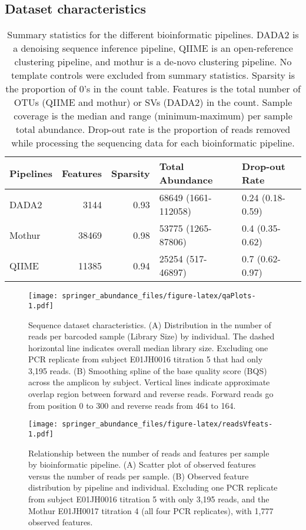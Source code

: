 \documentclass[smallextended]{svjour3}       %
\begin{document}
\hypertarget{dataset-characteristics}{%
\subsection{Dataset characteristics}\label{dataset-characteristics}}

\begin{table}

\caption{\label{tab:pipeQA}Summary statistics for the different bioinformatic pipelines. DADA2 is a denoising sequence inference pipeline, QIIME is an open-reference clustering pipeline, and mothur is a de-novo clustering pipeline. No template controls were excluded from summary statistics. Sparsity is the proportion of 0's in the count table. Features is the total number of OTUs (QIIME and mothur) or SVs (DADA2) in the count. Sample coverage is the median and range (minimum-maximum) per sample total abundance. Drop-out rate is the proportion of reads removed while processing the sequencing data for each bioinformatic pipeline.}
\centering
\begin{tabular}[t]{lrrll}
\toprule
Pipelines & Features & Sparsity & Total Abundance & Drop-out Rate\\
\midrule
DADA2 & 3144 & 0.93 & 68649 (1661-112058) & 0.24 (0.18-0.59)\\
Mothur & 38469 & 0.98 & 53775 (1265-87806) & 0.4 (0.35-0.62)\\
QIIME & 11385 & 0.94 & 25254 (517-46897) & 0.7 (0.62-0.97)\\
\bottomrule
\end{tabular}
\end{table}

\begin{figure}
\centering
\texttt{[image: springer\_abundance\_files/figure-latex/qaPlots-1.pdf]}
\caption{\label{fig:qaPlots}Sequence dataset characteristics. (A)
Distribution in the number of reads per barcoded sample (Library Size)
by individual. The dashed horizontal line indicates overall median
library size. Excluding one PCR replicate from subject E01JH0016
titration 5 that had only 3,195 reads. (B) Smoothing spline of the base
quality score (BQS) across the amplicon by subject. Vertical lines
indicate approximate overlap region between forward and reverse reads.
Forward reads go from position 0 to 300 and reverse reads from 464 to
164.}
\end{figure}

\begin{figure}
\centering
\texttt{[image: springer\_abundance\_files/figure-latex/readsVfeats-1.pdf]}
\caption{\label{fig:readsVfeats}Relationship between the number of reads and
features per sample by bioinformatic pipeline. (A) Scatter plot of
observed features versus the number of reads per sample. (B) Observed
feature distribution by pipeline and individual. Excluding one PCR
replicate from subject E01JH0016 titration 5 with only 3,195 reads, and
the Mothur E01JH0017 titration 4 (all four PCR replicates), with 1,777
observed features.}
\end{figure}
\end{document}
